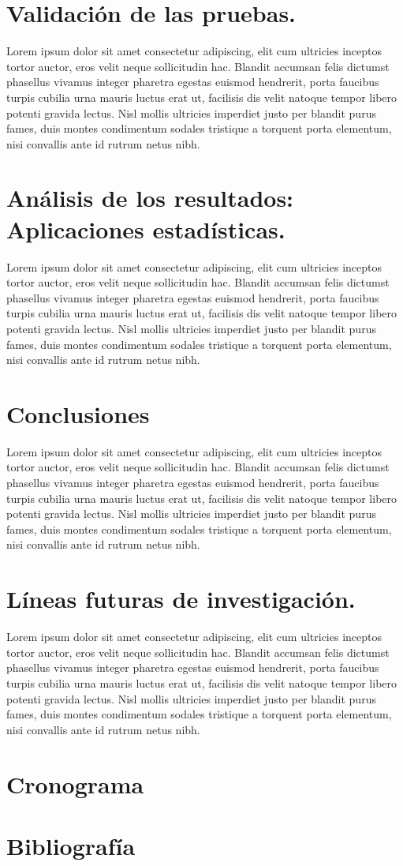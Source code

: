 \section{Validación de las pruebas.}
Lorem ipsum dolor sit amet consectetur adipiscing, elit cum ultricies inceptos tortor auctor, eros velit neque sollicitudin hac. Blandit accumsan felis dictumst phasellus vivamus integer pharetra egestas euismod hendrerit, porta faucibus turpis cubilia urna mauris luctus erat ut, facilisis dis velit natoque tempor libero potenti gravida lectus. Nisl mollis ultricies imperdiet justo per blandit purus fames, duis montes condimentum sodales tristique a torquent porta elementum, nisi convallis ante id rutrum netus nibh.
\section{Análisis de los resultados: Aplicaciones estadísticas.}
Lorem ipsum dolor sit amet consectetur adipiscing, elit cum ultricies inceptos tortor auctor, eros velit neque sollicitudin hac. Blandit accumsan felis dictumst phasellus vivamus integer pharetra egestas euismod hendrerit, porta faucibus turpis cubilia urna mauris luctus erat ut, facilisis dis velit natoque tempor libero potenti gravida lectus. Nisl mollis ultricies imperdiet justo per blandit purus fames, duis montes condimentum sodales tristique a torquent porta elementum, nisi convallis ante id rutrum netus nibh.
\section{Conclusiones}
Lorem ipsum dolor sit amet consectetur adipiscing, elit cum ultricies inceptos tortor auctor, eros velit neque sollicitudin hac. Blandit accumsan felis dictumst phasellus vivamus integer pharetra egestas euismod hendrerit, porta faucibus turpis cubilia urna mauris luctus erat ut, facilisis dis velit natoque tempor libero potenti gravida lectus. Nisl mollis ultricies imperdiet justo per blandit purus fames, duis montes condimentum sodales tristique a torquent porta elementum, nisi convallis ante id rutrum netus nibh.
\section{Líneas futuras de investigación.}
Lorem ipsum dolor sit amet consectetur adipiscing, elit cum ultricies inceptos tortor auctor, eros velit neque sollicitudin hac. Blandit accumsan felis dictumst phasellus vivamus integer pharetra egestas euismod hendrerit, porta faucibus turpis cubilia urna mauris luctus erat ut, facilisis dis velit natoque tempor libero potenti gravida lectus. Nisl mollis ultricies imperdiet justo per blandit purus fames, duis montes condimentum sodales tristique a torquent porta elementum, nisi convallis ante id rutrum netus nibh.
\section{Cronograma}

\section{Bibliografía}
\printbibliography[heading=none]


